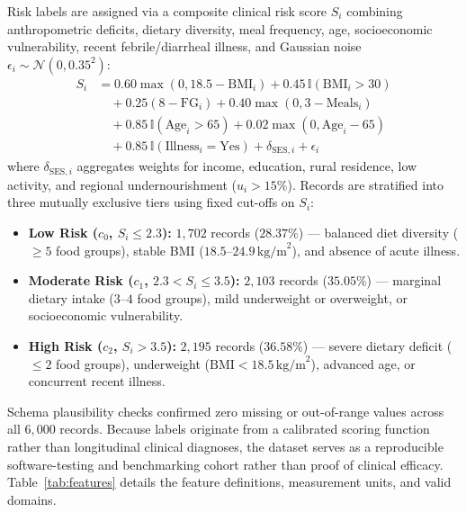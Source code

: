 \documentclass[conference]{IEEEtran}
\begin{document}
Risk labels are assigned via a composite clinical risk score $S_i$ combining anthropometric deficits, dietary diversity, meal frequency, age, socioeconomic vulnerability, recent febrile/diarrheal illness, and Gaussian noise $\epsilon_i \sim \mathcal{N}(0, 0.35^2)$:
\begin{equation}
\begin{aligned}
    S_i &= 0.60\max(0, 18.5 - \text{BMI}_i) + 0.45\,\mathbb{I}(\text{BMI}_i > 30) \\
    &\quad + 0.25(8 - \text{FG}_i) + 0.40\max(0, 3 - \text{Meals}_i) \\
    &\quad + 0.85\,\mathbb{I}(\text{Age}_i > 65) + 0.02\max(0, \text{Age}_i - 65) \\
    &\quad + 0.85\,\mathbb{I}(\text{Illness}_i = \text{Yes}) + \delta_{\text{SES},i} + \epsilon_i
\end{aligned}
\end{equation}
where $\delta_{\text{SES},i}$ aggregates weights for income, education, rural residence, low activity, and regional undernourishment ($u_i > 15\%$). Records are stratified into three mutually exclusive tiers using fixed cut-offs on $S_i$:
\begin{itemize}
    \item \textbf{Low Risk ($c_0$, $S_i \le 2.3$):} $1{,}702$ records ($28.37\%$) — balanced diet diversity ($\ge 5$ food groups), stable BMI ($18.5$--$24.9\,\text{kg/m}^2$), and absence of acute illness.
    \item \textbf{Moderate Risk ($c_1$, $2.3 < S_i \le 3.5$):} $2{,}103$ records ($35.05\%$) — marginal dietary intake ($3$--$4$ food groups), mild underweight or overweight, or socioeconomic vulnerability.
    \item \textbf{High Risk ($c_2$, $S_i > 3.5$):} $2{,}195$ records ($36.58\%$) — severe dietary deficit ($\le 2$ food groups), underweight ($\text{BMI} < 18.5\,\text{kg/m}^2$), advanced age, or concurrent recent illness.
\end{itemize}

Schema plausibility checks confirmed zero missing or out-of-range values across all $6{,}000$ records. Because labels originate from a calibrated scoring function rather than longitudinal clinical diagnoses, the dataset serves as a reproducible software-testing and benchmarking cohort rather than proof of clinical efficacy. Table~\ref{tab:features} details the feature definitions, measurement units, and valid domains.
\end{document}
